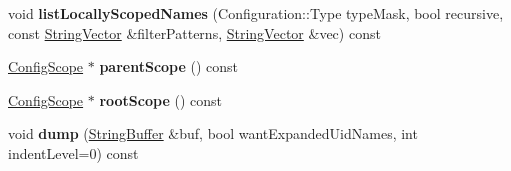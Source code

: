 \begin{DoxyCompactItemize}
\item 
\hypertarget{classCONFIG4CPP__NAMESPACE_1_1ConfigScope_ae134663c3719c1c3e2b1722083a6f694}{void {\bfseries list\-Locally\-Scoped\-Names} (Configuration\-::\-Type type\-Mask, bool recursive, const \hyperlink{classCONFIG4CPP__NAMESPACE_1_1StringVector}{String\-Vector} \&filter\-Patterns, \hyperlink{classCONFIG4CPP__NAMESPACE_1_1StringVector}{String\-Vector} \&vec) const }\label{classCONFIG4CPP__NAMESPACE_1_1ConfigScope_ae134663c3719c1c3e2b1722083a6f694}

\item 
\hypertarget{classCONFIG4CPP__NAMESPACE_1_1ConfigScope_ac5be996819457c45865ef96905891dc4}{\hyperlink{classCONFIG4CPP__NAMESPACE_1_1ConfigScope}{Config\-Scope} $\ast$ {\bfseries parent\-Scope} () const }\label{classCONFIG4CPP__NAMESPACE_1_1ConfigScope_ac5be996819457c45865ef96905891dc4}

\item 
\hypertarget{classCONFIG4CPP__NAMESPACE_1_1ConfigScope_af53f0d942b0ab10915d2f3d0ed212b45}{\hyperlink{classCONFIG4CPP__NAMESPACE_1_1ConfigScope}{Config\-Scope} $\ast$ {\bfseries root\-Scope} () const }\label{classCONFIG4CPP__NAMESPACE_1_1ConfigScope_af53f0d942b0ab10915d2f3d0ed212b45}

\item 
\hypertarget{classCONFIG4CPP__NAMESPACE_1_1ConfigScope_a7e95e74ee979c6722169ccbbc95d0053}{void {\bfseries dump} (\hyperlink{classCONFIG4CPP__NAMESPACE_1_1StringBuffer}{String\-Buffer} \&buf, bool want\-Expanded\-Uid\-Names, int indent\-Level=0) const }\label{classCONFIG4CPP__NAMESPACE_1_1ConfigScope_a7e95e74ee979c6722169ccbbc95d0053}

\end{DoxyCompactItemize}

